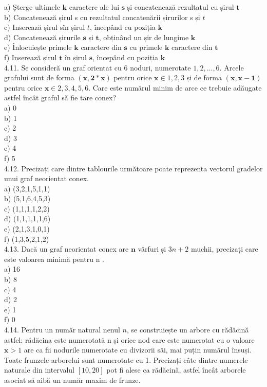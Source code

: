 a) Șterge ultimele $\mathbf{k}$ caractere ale lui $\mathbf{s}$ și concatenează rezultatul cu șirul $\mathbf{t}$
\\
b) Concatenează șirul s cu rezultatul concatenării șirurilor s și $t$
\\
c) Inserează șirul sîn șirul $t$, începând cu poziția $\mathbf{k}$
\\
d) Concatenează șirurile $\mathbf{s}$ și $\mathbf{t}$, obținând un șir de lungime $\mathbf{k}$
\\
e) Înlocuiește primele $\mathbf{k}$ caractere din $\mathbf{s}$ cu primele $\mathbf{k}$ caractere din $\mathbf{t}$
\\
f) Inserează șirul $\mathbf{t}$ în șirul $\mathbf{s}$, începând cu poziția $\mathbf{k}$
\\
4.11. Se consideră un graf orientat cu 6 noduri, numerotate $1,2, \ldots, 6$. Arcele grafului sunt de forma $(\mathbf{x}, \mathbf{2 *} \mathbf{x})$ pentru orice $\mathbf{x} \in{1,2,3}$ și de forma $(\mathbf{x}, \mathbf{x}-\mathbf{1})$ pentru orice $\mathbf{x} \in{2,3,4,5,6}$. Care este numărul minim de arce ce trebuie adăugate astfel încât graful să fie tare conex?
\\
a) 0
\\
b) 1
\\
c) 2
\\
d) 3
\\
e) 4
\\
f) 5
\\
4.12. Precizați care dintre tablourile următoare poate reprezenta vectorul gradelor unui graf neorientat conex.
\\
a) (3,2,1,5,1,1)
\\
b) (5,1,6,4,5,3)
\\
c) (1,1,1,1,2,2)
\\
d) (1,1,1,1,1,6)
\\
e) (2,1,3,1,0,1)
\\
f) (1,3,5,2,1,2)
\\
4.13. Dacă un graf neorientat conex are $\mathbf{n}$ vârfuri și $3 n+2$ muchii, precizați care este valoarea minimă pentru n .
\\
a) 16
\\
b) 8
\\
c) 4
\\
d) 2
\\
e) 1
\\
f) 0
\\
4.14. Pentru un număr natural nenul $n$, se construiește un arbore cu rădăcină astfel: rădăcina este numerotată n și orice nod care este numerotat cu o valoare $\mathbf{x}>1$ are ca fii nodurile numerotate cu divizorii săi, mai puțin numărul însuși. Toate frunzele arborelui sunt numerotate cu 1. Precizați câte dintre numerele naturale din intervalul $[10,20]$ pot fi alese ca rădăcină, astfel încât arborele asociat să aibă un număr maxim de frunze.

